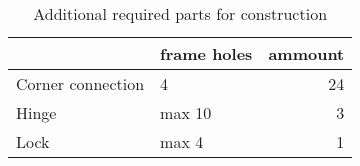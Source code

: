 \begin{table}[h!]
\centering
\caption{Additional required parts for construction}
\begin{tabular}{llr}
\toprule
{} & frame holes &  ammount \\
\midrule
Corner connection &           4 &       24 \\
Hinge             &      max 10 &        3 \\
Lock              &       max 4 &        1 \\
\bottomrule
\end{tabular}
\end{table}
